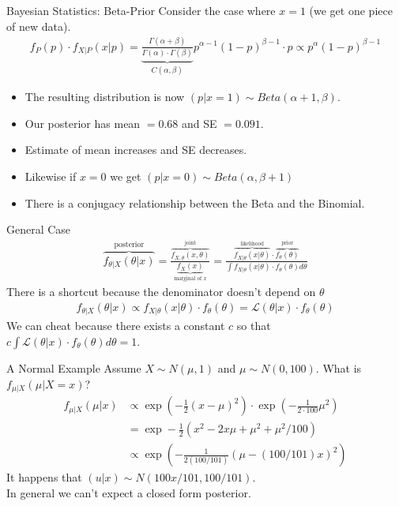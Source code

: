 \documentclass[aspectratio=169]{beamer}
\begin{document}
\begin{frame}{Bayesian Statistics: Beta-Prior}
Consider the case where $x=1$ (we get one piece of new data).
\begin{align*}
f _ { P } ( p ) \cdot f _ { X | P } ( x | p ) =\underbrace{ \frac { \Gamma ( \alpha + \beta ) } { \Gamma ( \alpha ) \cdot \Gamma ( \beta ) }}_{C(\alpha,\beta)} p ^ { \alpha - 1 } ( 1 - p ) ^ { \beta - 1 } \cdot p \propto  p ^ { \alpha  } ( 1 - p ) ^ { \beta - 1 } 
\end{align*}
\begin{itemize}
\item The resulting distribution is now $(p|x=1)\sim Beta(\alpha+1,\beta)$.
\item Our posterior has mean $=0.68$ and SE $=0.091$.
\item Estimate of mean increases and SE decreases.
\item Likewise if $x=0$ we get $(p|x=0)\sim Beta(\alpha,\beta+1)$
\item There is a \alert{conjugacy} relationship between the Beta and the Binomial.
\end{itemize}
\end{frame}



\begin{frame}{General Case}
\begin{align*}
\overbrace{f_{\theta|X}(\theta | x)}^{\text{posterior}}=\frac{\overbrace{f_{X, \theta}(x, \theta)}^{\text{joint}}}{ \underbrace{f_{X}(x)}_{\text{marginal of } x}}
=\frac{\overbrace{f_{X|\theta}(x | \theta)}^{\text{likelihood}} \cdot  \overbrace{f_{\theta}(\theta)}^{\text{prior}}}{\int f_{X|\theta}(x | \theta) \cdot f_{\theta}(\theta) d \theta}
\end{align*}
There is a shortcut because the denominator doesn't depend on $\theta$
\begin{align*}
f_{\theta|X}(\theta | x) \propto f_{X|\theta}(x | \theta) \cdot f_{\theta}(\theta)=\mathcal{L}(\theta | x) \cdot f_{\theta}(\theta)
\end{align*}
We can cheat because there exists a constant $c$ so that $c \int \mathcal{L}(\theta | x) \cdot f_{\theta}(\theta) d \theta=1$.
\end{frame}

\begin{frame}{A Normal Example}
Assume $X \sim N(\mu,1)$ and $\mu \sim N(0,100)$. What is $f_{\mu | X}(\mu | X=x)$?
\begin{align*}
f_{\mu|X}(\mu | x) &\propto \exp \left(-\frac{1}{2}(x-\mu)^{2}\right) \cdot \exp \left(-\frac{1}{2 \cdot 100} \mu^{2}\right)\\
&=\exp -\frac{1}{2} (x^{2}-2 x \mu+\mu^{2}+\mu^{2} / 100) \\
&\propto \exp \left(-\frac{1}{2(100 / 101)}(\mu-(100 / 101) x)^{2}\right)
\end{align*}
It happens that $(u | x) \sim N(100x/101 , 100/101)$. \\
In general we can't expect a closed form posterior.
\end{frame}
\end{document}
